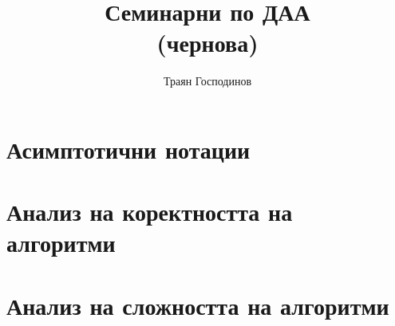\documentclass[a4paper,12pt,oneside]{book}%
\title{Семинарни по ДАА\\\large (чернова)}
\author{Траян Господинов}
\begin{document}
 
	
	\maketitle
	
	\tableofcontents
	
	\chapter{Асимптотични нотации}
	
	
	\chapter{Анализ на коректността на алгоритми}
	
	
	\chapter{Анализ на сложността на алгоритми}
	

\end{document}
